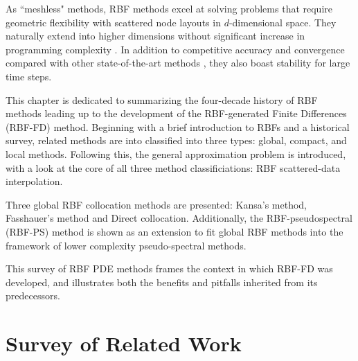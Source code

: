 \documentclass[11pt]{report}
\begin{document}
{As ``meshless" methods, RBF methods excel at solving problems that require geometric flexibility with scattered node layouts in $d$-dimensional space. They naturally extend into higher dimensions without significant increase in programming complexity \cite{FlyerWright07,WrightFlyerYuen10}. In addition to competitive accuracy and convergence compared with other state-of-the-art methods \cite{FlyerWright07, FlyerWright09, FlyerLehto10, WrightFlyerYuen10, FlyerFornberg11}, they also boast stability for large time steps.

This chapter is dedicated to summarizing the four-decade history of RBF methods leading up to the development of the 
RBF-generated Finite Differences (RBF-FD) method. Beginning with a brief introduction to RBFs and a historical survey, related methods are into classified into three types: global, compact, and local methods. Following this, the general approximation problem is introduced, with a look at the core of all three method classificiations: RBF scattered-data interpolation. %

Three global RBF collocation methods are presented: Kansa's method, Fasshauer's method and Direct collocation.
Additionally, the RBF-pseudospectral (RBF-PS) method is shown as an extension to fit global RBF methods into the framework of lower complexity pseudo-spectral methods. %

This survey of RBF PDE methods frames the context in which RBF-FD was developed, and illustrates both the benefits and pitfalls inherited from its predecessors. 

\section{Survey of Related Work}

}
\end{document}
